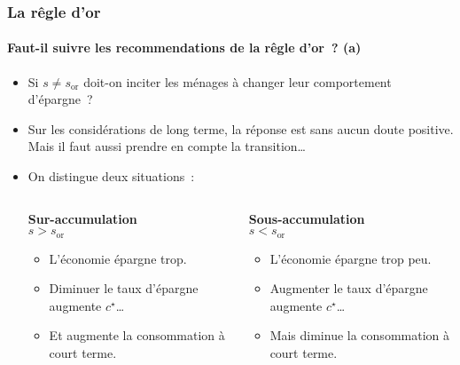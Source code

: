 \documentclass[10pt,notheorems]{beamer}
\theoremstyle{plain}
\theoremstyle{definition} %
\begin{document}
\begin{frame}
  \frametitle{La rêgle d'or}
  \framesubtitle{Faut-il suivre les recommendations de la rêgle d'or~? (a)}

  \bigskip

  \begin{itemize}

  \item Si $s\neq s_{\mathrm{or}}$ doit-on inciter les ménages à changer leur comportement d'épargne~?\newline

  \item Sur les considérations de long terme, la réponse est sans aucun doute positive. Mais il faut aussi prendre en compte la transition\ldots\newline

  \item On distingue deux situations~:\newline

    \begin{columns}
      \begin{column}{.5\textwidth}
        \begin{Center}
          \textbf{Sur-accumulation}\\
          $s>s_{\mathrm{or}}$
        \end{Center}
        \begin{itemize}
        \item L'économie épargne trop.\newline
        \item Diminuer le taux d'épargne augmente $c^{\star}$\ldots\newline
        \item Et augmente la consommation à court terme.
        \end{itemize}
      \end{column}
      \begin{column}{.5\textwidth}
        \begin{Center}
          \textbf{Sous-accumulation}\\
          $s<s_{\mathrm{or}}$
        \end{Center}
        \begin{itemize}
        \item L'économie épargne trop peu.\newline
        \item Augmenter le taux d'épargne augmente $c^{\star}$\ldots\newline
        \item Mais diminue la consommation à court terme.
        \end{itemize}
      \end{column}
    \end{columns}

  \end{itemize}

\end{frame}
\end{document}
